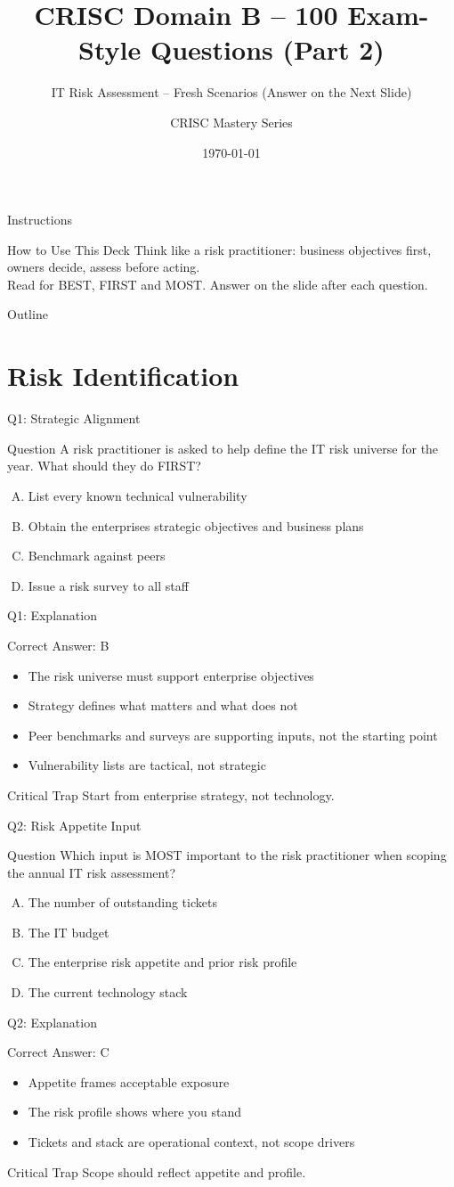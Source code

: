 \documentclass[aspectratio=169]{beamer}
\title{CRISC Domain B -- 100 Exam-Style Questions (Part 2)}
\subtitle{IT Risk Assessment -- Fresh Scenarios (Answer on the Next Slide)}
\author{CRISC Mastery Series}
\date{\today}
\newcommand{\hq}[7]{%
	\begin{frame}{Q#1: #2}
		\begin{block}{Question}
			#3
		\end{block}
		\begin{enumerate}[(A)]
			#4
		\end{enumerate}
	\end{frame}
	\begin{frame}{Q#1: Explanation}
		\begin{block}{Correct Answer: #5}
			\begin{itemize}
				#6
			\end{itemize}
		\end{block}
		\begin{alertblock}{Critical Trap}
			#7
		\end{alertblock}
	\end{frame}
}
\begin{document}
	
	\begin{frame}\titlepage\end{frame}
	
	\begin{frame}{Instructions}
		\begin{alertblock}{How to Use This Deck}
			Think like a risk practitioner: business objectives first, owners decide, assess before acting.\\
			Read for BEST, FIRST and MOST. Answer on the slide after each question.
		\end{alertblock}
	\end{frame}
	
	\begin{frame}{Outline}
		\tableofcontents
	\end{frame}
	
	\section{Risk Identification}
	
	\hq{1}{Strategic Alignment}
	{A risk practitioner is asked to help define the IT risk universe for the year. What should they do FIRST?}
	{\item List every known technical vulnerability
		\item Obtain the enterprise\textquotesingle s strategic objectives and business plans
		\item Benchmark against peers
		\item Issue a risk survey to all staff}
	{B}
	{\item The risk universe must support enterprise objectives
		\item Strategy defines what matters and what does not
		\item Peer benchmarks and surveys are supporting inputs, not the starting point
		\item Vulnerability lists are tactical, not strategic}
	{Start from enterprise strategy, not technology.}
	
	\hq{2}{Risk Appetite Input}
	{Which input is MOST important to the risk practitioner when scoping the annual IT risk assessment?}
	{\item The number of outstanding tickets
		\item The IT budget
		\item The enterprise risk appetite and prior risk profile
		\item The current technology stack}
	{C}
	{\item Appetite frames acceptable exposure
		\item The risk profile shows where you stand
		\item Tickets and stack are operational context, not scope drivers}
	{Scope should reflect appetite and profile.}
	
\end{document}
